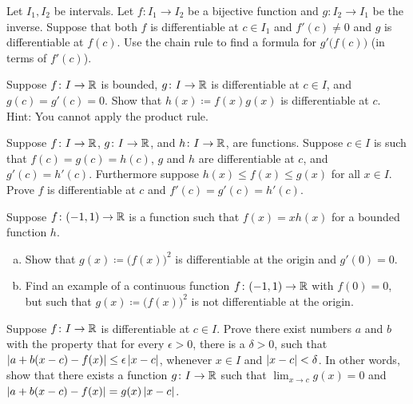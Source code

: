 \begin{exercise} \label{exercise:inversederformula}
Let $I_1, I_2$ be intervals.
Let $f \colon I_1 \to I_2$ be a bijective function and $g \colon I_2 \to I_1$
be the inverse.  Suppose that both $f$ is differentiable at $c \in I_1$ and
$f'(c) \not=0$ and $g$ is differentiable at $f(c)$.  Use the chain rule
to find a formula for $g'\bigl(f(c)\bigr)$ (in terms of $f'(c)$).
\end{exercise}

\begin{exercise} \label{exercise:bndmuldiff}
Suppose $f \colon I \to {\mathbb{R}}$ is bounded, $g \colon I \to
{\mathbb{R}}$ is differentiable at $c \in I$, and $g(c) = g'(c) = 0$.  Show
that $h(x) \coloneqq f(x) g(x)$ is differentiable at $c$.  Hint: You
cannot apply the product rule.
\end{exercise}

\begin{exercise} \label{exercise:diffsqueeze}
Suppose $f \colon I \to {\mathbb{R}}$, 
$g \colon I \to {\mathbb{R}}$, and
$h \colon I \to {\mathbb{R}}$, are functions.  Suppose $c \in I$ is such that
$f(c) = g(c) = h(c)$, $g$ and $h$ are differentiable at $c$,
and $g'(c) = h'(c)$.  Furthermore suppose $h(x) \leq f(x) \leq g(x)$ for
all $x \in I$.  Prove $f$ is differentiable at $c$ and $f'(c) = g'(c) =
h'(c)$.
\end{exercise}

\begin{exercise}
Suppose $f \colon (-1,1) \to {\mathbb{R}}$ is a function such that $f(x) = x h(x)$ for a bounded
function $h$.
\begin{enumerate}[a)]
\item
Show that $g(x) \coloneqq {\bigl( f(x) \bigr)}^2$ is
differentiable at the origin and $g'(0) = 0$.
\item
Find an example of a
continuous function $f \colon (-1,1) \to {\mathbb{R}}$ with $f(0) = 0$, but such
that $g(x) \coloneqq {\bigl( f(x) \bigr)}^2$ is not differentiable at the origin.
\end{enumerate}
\end{exercise}

\begin{exercise}
Suppose $f \colon I \to {\mathbb{R}}$ is differentiable at $c \in I$.
Prove there exist numbers $a$ and $b$ with the property that
for every $\epsilon > 0$, there is a $\delta > 0$, such that
$\left\lvert {a+b(x-c) - f(x)} \right\rvert \leq \epsilon \left\lvert {x-c} \right\rvert$, whenever $x \in I$ and
$\left\lvert {x-c} \right\rvert < \delta$.
In other words, show that
there exists a function $g \colon I \to {\mathbb{R}}$
such that $\lim_{x\to c} g(x) = 0$ and
$\left\lvert {a+b(x-c) - f(x)} \right\rvert = g(x) \left\lvert {x-c} \right\rvert$.
\end{exercise}

